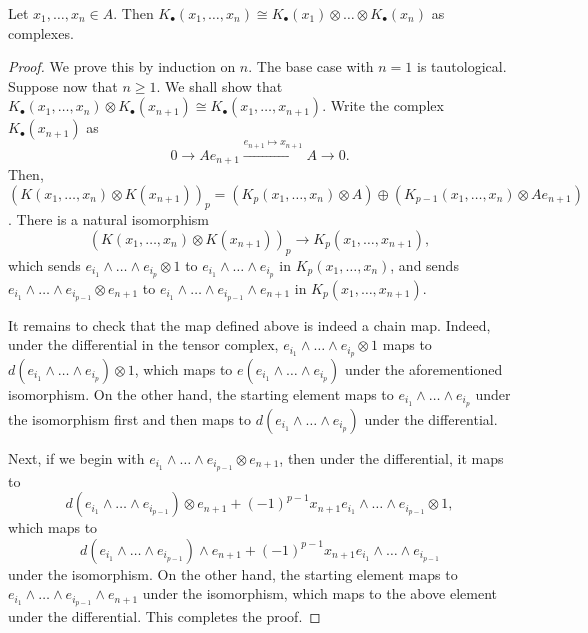 \begin{proposition}
    Let $x_1,\dots,x_n\in A$. Then $K_\bullet(x_1,\dots,x_n)\cong K_\bullet(x_1)\otimes\dots\otimes K_\bullet(x_n)$ as complexes.
\end{proposition}
\begin{proof}
    We prove this by induction on $n$. The base case with $n = 1$ is tautological. Suppose now that $n\ge 1$. We shall show that $K_\bullet(x_1,\dots,x_n)\otimes K_\bullet(x_{n + 1})\cong K_\bullet(x_1,\dots,x_{n + 1})$. Write the complex $K_\bullet(x_{n + 1})$ as 
    \begin{equation*}
        0\longrightarrow Ae_{n + 1}\xrightarrow{e_{n + 1}\mapsto x_{n + 1}} A\longrightarrow 0.
    \end{equation*}
    Then, $\left(K(x_1,\dots,x_n)\otimes K(x_{n + 1})\right)_p = \left(K_p(x_1,\dots,x_{n})\otimes A\right)\oplus\left(K_{p - 1}(x_1,\dots,x_n)\otimes Ae_{n + 1}\right)$. There is a natural isomorphism 
    \begin{equation*}
        \left(K(x_1,\dots,x_n)\otimes K(x_{n + 1})\right)_p\longrightarrow K_p(x_1,\dots,x_{n + 1}),
    \end{equation*}
    which sends $e_{i_1}\wedge\dots\wedge e_{i_p}\otimes 1$ to $e_{i_1}\wedge\dots\wedge e_{i_p}$ in $K_p(x_1,\dots,x_n)$, and sends $e_{i_1}\wedge\dots\wedge e_{i_{p - 1}}\otimes e_{n + 1}$ to $e_{i_1}\wedge\dots\wedge e_{i_{p - 1}}\wedge e_{n + 1}$ in $K_p(x_1,\dots,x_{n + 1})$.

    It remains to check that the map defined above is indeed a chain map. Indeed, under the differential in the tensor complex, $e_{i_1}\wedge\dots\wedge e_{i_p}\otimes 1$ maps to $d(e_{i_1}\wedge\dots\wedge e_{i_p})\otimes 1$, which maps to $e(e_{i_1}\wedge\dots\wedge e_{i_p})$ under the aforementioned isomorphism. On the other hand, the starting element maps to $e_{i_1}\wedge\dots\wedge e_{i_p}$ under the isomorphism first and then maps to $d(e_{i_1}\wedge\dots\wedge e_{i_p})$ under the differential.

    Next, if we begin with $e_{i_1}\wedge\dots\wedge e_{i_{p - 1}}\otimes e_{n + 1}$, then under the differential, it maps to 
    \begin{equation*}
        d(e_{i_1}\wedge\dots\wedge e_{i_{p - 1}})\otimes e_{n + 1} + (-1)^{p - 1}x_{n + 1} e_{i_1}\wedge\dots\wedge e_{i_{p - 1}}\otimes 1,
    \end{equation*}
    which maps to 
    \begin{equation*}
        d(e_{i_1}\wedge\dots\wedge e_{i_{p - 1}})\wedge e_{n + 1} + (-1)^{p - 1} x_{n + 1} e_{i_1}\wedge\dots\wedge e_{i_{p - 1}}
    \end{equation*}
    under the isomorphism. On the other hand, the starting element maps to $e_{i_1}\wedge\dots\wedge e_{i_{p - 1}}\wedge e_{n + 1}$ under the isomorphism, which maps to the above element under the differential. This completes the proof.
\end{proof}

